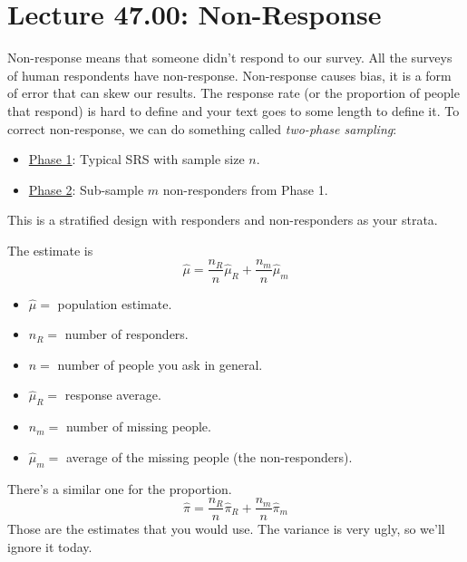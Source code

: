 \section{Lecture 47.00: Non-Response}
Non-response
means that someone didn't
respond to our survey. All the surveys
of human respondents have non-response.
Non-response causes bias, it is a form of
error that can skew our results. The response
rate (or the proportion of people that respond)
is hard to define and your text goes to some
length to define it. To correct non-response,
we can do something called \emph{two-phase sampling}:
\begin{itemize}
    \item \underline{Phase 1}: Typical SRS with sample size $ n $.
    \item \underline{Phase 2}: Sub-sample $ m $ non-responders from Phase 1.
\end{itemize}
This is a stratified design with responders and non-responders as your strata.

The estimate is
\[ \hat{\mu}=\frac{n_R}{n} \hat{\mu}_R+\frac{n_m}{n} \hat{\mu}_m \]
\begin{itemize}
    \item $ \hat{\mu} = $ population estimate.
    \item $ n_R = $ number of responders.
    \item $ n= $ number of people you ask in general.
    \item $ \hat{\mu}_R= $ response average.
    \item $ n_m= $ number of missing people.
    \item $ \hat{\mu}_m= $ average of the missing people (the non-responders).
\end{itemize}
There's a similar one for the proportion.
\[ \hat{\pi}=\frac{n_R}{n} \hat{\pi}_R+\frac{n_m}{n} \hat{\pi}_m \]
Those are the estimates that you would use.
The variance is very ugly, so we'll ignore it today.
